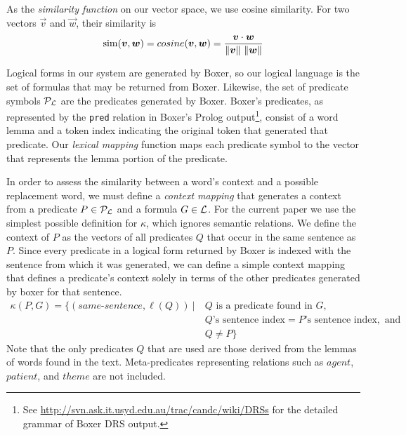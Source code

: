 As the \emph{similarity function} \simfunc on our vector space, we use cosine
similarity. For two vectors $\vec v$ and $\vec w$, their similarity is 
\[ \simfunc(\vec v, \vec w) = cosine(\vec v, \vec w) = \frac{\vec v \cdot \vec
w}{\|\vec v\|~\|\vec w\|}\]

Logical forms in our system are generated by Boxer, so our logical language
\loglang is the set of formulas that may be returned from Boxer.  Likewise, the
set of predicate symbols ${\cal{P}}_{{\cal{L}}}$ are the predicates generated by
Boxer. Boxer's predicates, as represented by the {\tt pred} relation in Boxer's
Prolog output\footnote{See
\url{http://svn.ask.it.usyd.edu.au/trac/candc/wiki/DRSs} for the detailed
grammar of Boxer DRS output.}, consist of a word lemma and a token index
indicating the original token that generated that predicate.  
Our \emph{lexical mapping} function maps each predicate symbol to the
vector that represents the lemma portion of the predicate.

In order to assess the similarity between a word's context and a possible
replacement word, we must define a \textit{context mapping} that generates a
context from a predicate $P \in {\cal{P}}_{{\cal{L}}}$ and a formula $G \in
{\cal{L}}$.  For the current paper we use the simplest possible
definition for $\kappa$, which ignores semantic relations. We define 
the context of $P$ as the
vectors of all predicates $Q$ that occur in the same sentence as $P$.
Since every predicate in a logical form returned by Boxer is indexed
with the sentence from which it was generated, we can define a simple context
mapping that defines a predicate's context solely in terms of the other
predicates generated by boxer for that sentence.
\begin{align*}
\kappa(P,G) = \{ (same\text{-}sentence, \ell(Q)) ~|
&~Q \text{ is a predicate found in } G, \\
&~Q\text{'s sentence index} = P\text{'s sentence index}, \text{ and } \\
&~Q \neq P \}
\end{align*}
Note that the only predicates $Q$ that are used are those derived from the
lemmas of words found in the text.  Meta-predicates representing relations such
as $agent$, $patient$, and $theme$ are not included.

